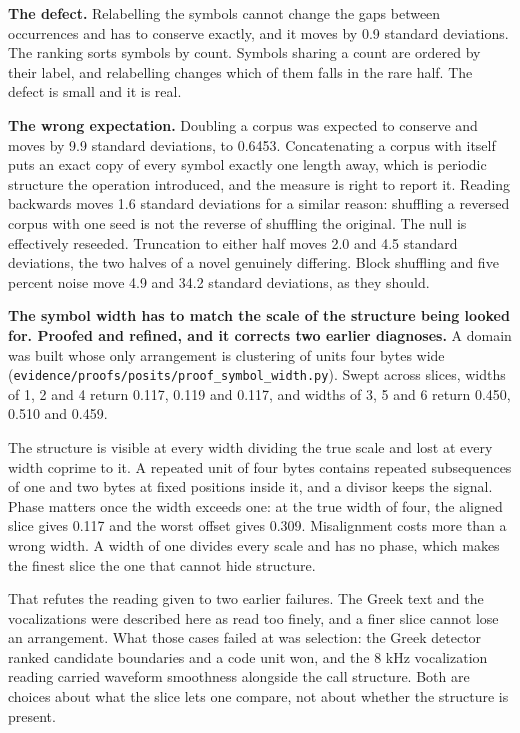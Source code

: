 \textbf{The defect.} Relabelling the symbols cannot change the gaps between occurrences and has to conserve exactly, and it moves by 0.9 standard deviations. The ranking sorts symbols by count. Symbols sharing a count are ordered by their label, and relabelling changes which of them falls in the rare half. The defect is small and it is real.

\textbf{The wrong expectation.} Doubling a corpus was expected to conserve and moves by 9.9 standard deviations, to 0.6453. Concatenating a corpus with itself puts an exact copy of every symbol exactly one length away, which is periodic structure the operation introduced, and the measure is right to report it. Reading backwards moves 1.6 standard deviations for a similar reason: shuffling a reversed corpus with one seed is not the reverse of shuffling the original. The null is effectively reseeded. Truncation to either half moves 2.0 and 4.5 standard deviations, the two halves of a novel genuinely differing. Block shuffling and five percent noise move 4.9 and 34.2 standard deviations, as they should.

\textbf{The symbol width has to match the scale of the structure being looked for. Proofed and refined, and it corrects two earlier diagnoses.} A domain was built whose only arrangement is clustering of units four bytes wide (\texttt{evidence/\allowbreak{}proofs/\allowbreak{}posits/\allowbreak{}proof\_\allowbreak{}symbol\_\allowbreak{}width.\allowbreak{}py}). Swept across slices, widths of 1, 2 and 4 return 0.117, 0.119 and 0.117, and widths of 3, 5 and 6 return 0.450, 0.510 and 0.459.

The structure is visible at every width dividing the true scale and lost at every width coprime to it. A repeated unit of four bytes contains repeated subsequences of one and two bytes at fixed positions inside it, and a divisor keeps the signal. Phase matters once the width exceeds one: at the true width of four, the aligned slice gives 0.117 and the worst offset gives 0.309. Misalignment costs more than a wrong width. A width of one divides every scale and has no phase, which makes the finest slice the one that cannot hide structure.

That refutes the reading given to two earlier failures. The Greek text and the vocalizations were described here as read too finely, and a finer slice cannot lose an arrangement. What those cases failed at was selection: the Greek detector ranked candidate boundaries and a code unit won, and the 8 kHz vocalization reading carried waveform smoothness alongside the call structure. Both are choices about what the slice lets one compare, not about whether the structure is present.


